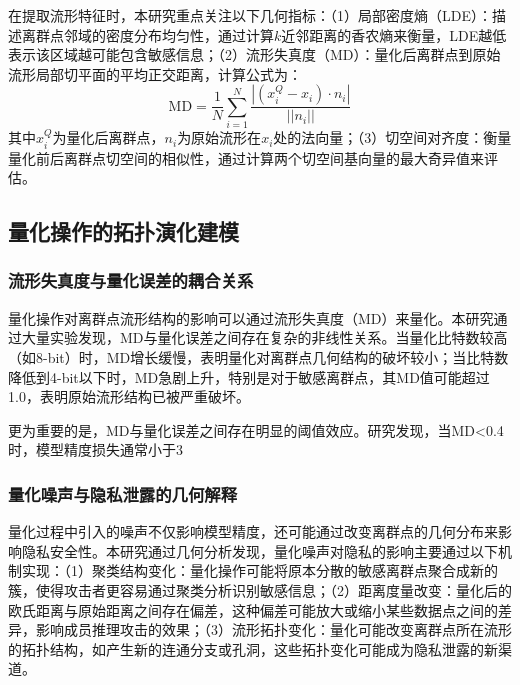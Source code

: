 在提取流形特征时，本研究重点关注以下几何指标：（1）局部密度熵（LDE）：描述离群点邻域的密度分布均匀性，通过计算$k$近邻距离的香农熵来衡量，LDE越低表示该区域越可能包含敏感信息；（2）流形失真度（MD）：量化后离群点到原始流形局部切平面的平均正交距离，计算公式为：
\begin{equation}
\text{MD} = \frac{1}{N}\sum_{i=1}^N \frac{|(x_i^Q - x_i) \cdot n_i|}{||n_i||}
\end{equation}
其中$x_i^Q$为量化后离群点，$n_i$为原始流形在$x_i$处的法向量；（3）切空间对齐度：衡量量化前后离群点切空间的相似性，通过计算两个切空间基向量的最大奇异值来评估。

\subsection{量化操作的拓扑演化建模}

\subsubsection{流形失真度与量化误差的耦合关系}

量化操作对离群点流形结构的影响可以通过流形失真度（MD）来量化。本研究通过大量实验发现，MD与量化误差之间存在复杂的非线性关系。当量化比特数较高（如8-bit）时，MD增长缓慢，表明量化对离群点几何结构的破坏较小；当比特数降低到4-bit以下时，MD急剧上升，特别是对于敏感离群点，其MD值可能超过1.0，表明原始流形结构已被严重破坏。

更为重要的是，MD与量化误差之间存在明显的阈值效应。研究发现，当MD<0.4时，模型精度损失通常小于3%

\subsubsection{量化噪声与隐私泄露的几何解释}

量化过程中引入的噪声不仅影响模型精度，还可能通过改变离群点的几何分布来影响隐私安全性。本研究通过几何分析发现，量化噪声对隐私的影响主要通过以下机制实现：（1）聚类结构变化：量化操作可能将原本分散的敏感离群点聚合成新的簇，使得攻击者更容易通过聚类分析识别敏感信息；（2）距离度量改变：量化后的欧氏距离与原始距离之间存在偏差，这种偏差可能放大或缩小某些数据点之间的差异，影响成员推理攻击的效果；（3）流形拓扑变化：量化可能改变离群点所在流形的拓扑结构，如产生新的连通分支或孔洞，这些拓扑变化可能成为隐私泄露的新渠道。

